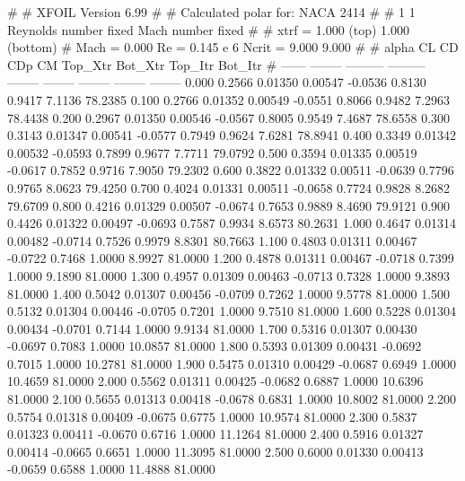 #  
#       XFOIL         Version 6.99
#  
# Calculated polar for: NACA 2414                                       
#  
# 1 1 Reynolds number fixed          Mach number fixed         
#  
# xtrf =   1.000 (top)        1.000 (bottom)  
# Mach =   0.000     Re =     0.145 e 6     Ncrit =   9.000  9.000
#  
#   alpha    CL        CD       CDp       CM     Top_Xtr  Bot_Xtr  Top_Itr  Bot_Itr
#  ------ -------- --------- --------- -------- -------- -------- -------- --------
   0.000   0.2566   0.01350   0.00547  -0.0536   0.8130   0.9417   7.1136  78.2385
   0.100   0.2766   0.01352   0.00549  -0.0551   0.8066   0.9482   7.2963  78.4438
   0.200   0.2967   0.01350   0.00546  -0.0567   0.8005   0.9549   7.4687  78.6558
   0.300   0.3143   0.01347   0.00541  -0.0577   0.7949   0.9624   7.6281  78.8941
   0.400   0.3349   0.01342   0.00532  -0.0593   0.7899   0.9677   7.7711  79.0792
   0.500   0.3594   0.01335   0.00519  -0.0617   0.7852   0.9716   7.9050  79.2302
   0.600   0.3822   0.01332   0.00511  -0.0639   0.7796   0.9765   8.0623  79.4250
   0.700   0.4024   0.01331   0.00511  -0.0658   0.7724   0.9828   8.2682  79.6709
   0.800   0.4216   0.01329   0.00507  -0.0674   0.7653   0.9889   8.4690  79.9121
   0.900   0.4426   0.01322   0.00497  -0.0693   0.7587   0.9934   8.6573  80.2631
   1.000   0.4647   0.01314   0.00482  -0.0714   0.7526   0.9979   8.8301  80.7663
   1.100   0.4803   0.01311   0.00467  -0.0722   0.7468   1.0000   8.9927  81.0000
   1.200   0.4878   0.01311   0.00467  -0.0718   0.7399   1.0000   9.1890  81.0000
   1.300   0.4957   0.01309   0.00463  -0.0713   0.7328   1.0000   9.3893  81.0000
   1.400   0.5042   0.01307   0.00456  -0.0709   0.7262   1.0000   9.5778  81.0000
   1.500   0.5132   0.01304   0.00446  -0.0705   0.7201   1.0000   9.7510  81.0000
   1.600   0.5228   0.01304   0.00434  -0.0701   0.7144   1.0000   9.9134  81.0000
   1.700   0.5316   0.01307   0.00430  -0.0697   0.7083   1.0000  10.0857  81.0000
   1.800   0.5393   0.01309   0.00431  -0.0692   0.7015   1.0000  10.2781  81.0000
   1.900   0.5475   0.01310   0.00429  -0.0687   0.6949   1.0000  10.4659  81.0000
   2.000   0.5562   0.01311   0.00425  -0.0682   0.6887   1.0000  10.6396  81.0000
   2.100   0.5655   0.01313   0.00418  -0.0678   0.6831   1.0000  10.8002  81.0000
   2.200   0.5754   0.01318   0.00409  -0.0675   0.6775   1.0000  10.9574  81.0000
   2.300   0.5837   0.01323   0.00411  -0.0670   0.6716   1.0000  11.1264  81.0000
   2.400   0.5916   0.01327   0.00414  -0.0665   0.6651   1.0000  11.3095  81.0000
   2.500   0.6000   0.01330   0.00413  -0.0659   0.6588   1.0000  11.4888  81.0000
